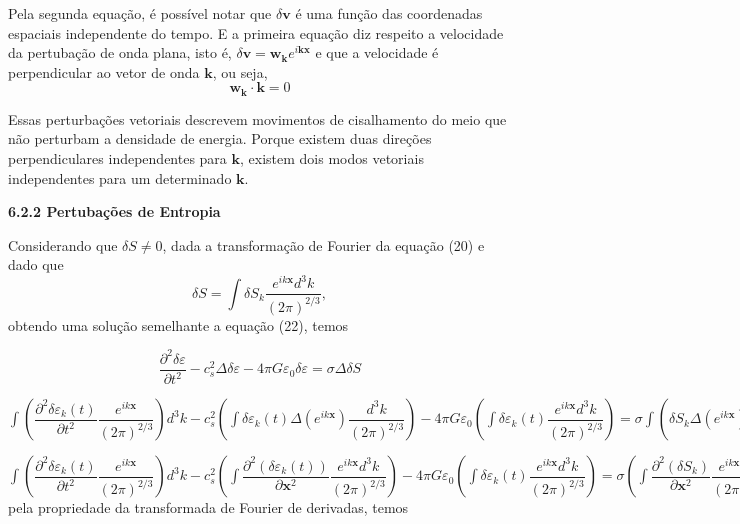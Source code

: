 \documentclass[a4paper,12pt]{article}
\begin{document}
Pela segunda equação, é possível notar que $\delta\mathbf{v}$ é uma função das coordenadas espaciais independente do tempo. E a primeira equação diz respeito a velocidade da pertubação de onda plana, isto é, $\delta\mathbf{v} = \mathbf{w_k} e^{i\mathbf{k}\mathbf{x}}$ e que a velocidade é perpendicular ao vetor de onda $\mathbf{k}$, ou seja,
\begin{equation}\label{eq29}
	\mathbf{w_k} \cdot \mathbf{k} = 0
\end{equation}

 Essas perturbações vetoriais descrevem movimentos de cisalhamento do meio que não perturbam a densidade de energia. Porque existem duas direções perpendiculares independentes para $\mathbf{k}$, existem dois modos vetoriais independentes para um determinado $\mathbf{k}$.
  \begin{center}
 	\textbf{6.2.2 Pertubações de Entropia}
 \end{center}

Considerando que $\delta S \neq 0$, dada a transformação de Fourier da equação (20) e dado que $$\delta S = \int \delta S_k \dfrac{e^{ik\textbf{x}}d^3 k}{(2\pi)^{2/3}}, $$ obtendo uma solução semelhante a equação (22), temos

$$\dfrac{\partial^2\delta\varepsilon}{\partial t^2} - c^2_s\Delta\delta\varepsilon - 4\pi G\varepsilon_0\delta\varepsilon = \sigma\Delta \delta S$$

$\displaystyle\int \left(\dfrac{\partial^2 \delta\varepsilon_k (t)}{\partial t^2}  \dfrac{e^{ik\textbf{x}}}{(2\pi)^{2/3}} \right)d^3 k  - c^2_s\left( \int \delta\varepsilon_k (t)\Delta (e^{ik\textbf{x}})  \dfrac{d^3 k}{(2\pi)^{2/3}} \right) - 4\pi G\varepsilon_0\left(\int \delta\varepsilon_k (t)  \dfrac{e^{ik\textbf{x}}d^3 k}{(2\pi)^{2/3}} \right) = \sigma \int \left(\delta S_k \Delta (e^{ik\textbf{x}})\dfrac{}{(2\pi)^{2/3}} \right)d^3 k$

$\displaystyle\int \left(\dfrac{\partial^2 \delta\varepsilon_k (t)}{\partial t^2}  \dfrac{e^{ik\textbf{x}}}{(2\pi)^{2/3}} \right)d^3 k  - c^2_s\left( \int  \dfrac{\partial^2  (\delta\varepsilon_k (t))}{\partial\textbf{x}^2} \dfrac{e^{ik\textbf{x}}d^3 k}{(2\pi)^{2/3}} \right) - 4\pi G\varepsilon_0\left(\int \delta\varepsilon_k (t)  \dfrac{e^{ik\textbf{x}}d^3 k}{(2\pi)^{2/3}} \right) = \sigma  \left(\int  \dfrac{\partial^2  (\delta S_k)}{\partial\textbf{x}^2} \dfrac{e^{ik\textbf{x}}d^3 k}{(2\pi)^{2/3}} \right)$
\newline
pela propriedade da transformada de Fourier de derivadas, temos 
\end{document}
